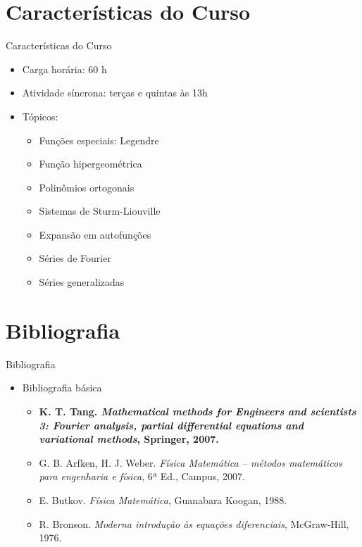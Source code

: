   \section[ slide = true ]{Características do Curso}
      \begin{slide}[toc=]{Características do Curso}
         \begin{itemize}
            \item Carga horária: 60 h
            \item Atividade síncrona: terças e quintas às 13h
            \item Tópicos:
            \begin{itemize}
               \item Funções especiais: Legendre
               \item Função hipergeométrica
               \item Polinômios ortogonais
	       \item Sistemas de Sturm-Liouville
               \item Expansão em autofunções
               \item Séries de Fourier
	       \item Séries generalizadas
            \end{itemize}
         \end{itemize}         
      \end{slide}
      
   \section[ slide = true ]{Bibliografia}
      \begin{slide}[toc=]{Bibliografia}
         \begin{itemize}
            \item Bibliografia básica
            \begin{itemize}
		    \item \textbf{K. T. Tang. \emph{Mathematical methods for Engineers and scientists 3: Fourier analysis, partial differential equations and variational methods}, Springer, 2007.}
               \item {G. B. Arfken, H. J. Weber. \emph{Física Matemática -- métodos matemáticos para engenharia e física}, 6ª Ed., Campus, 2007.}
               \item {E. Butkov. \emph{Física Matemática}, Guanabara Koogan, 1988.}
               \item {R. Bronson. \emph{Moderna introdução às equações diferenciais}, McGraw-Hill, 1976.}
            \end{itemize}
         \end{itemize}
      \end{slide}

